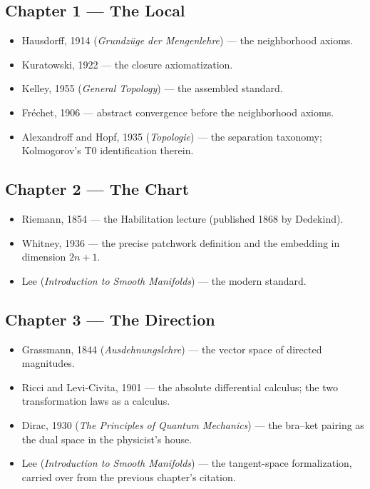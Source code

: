 \subsection*{Chapter 1 --- The Local}
\begin{itemize}
\item Hausdorff, 1914 (\emph{Grundz\"uge der Mengenlehre}) --- the
neighborhood axioms. \item Kuratowski, 1922 --- the closure
axiomatization. \item Kelley, 1955 (\emph{General Topology}) --- the
assembled standard. \item Fr\'echet, 1906 --- abstract convergence before
the neighborhood axioms. \item Alexandroff and Hopf, 1935
(\emph{Topologie}) --- the separation taxonomy; Kolmogorov's T0
identification therein.
\end{itemize}

\subsection*{Chapter 2 --- The Chart}
\begin{itemize}
\item Riemann, 1854 --- the Habilitation lecture (published 1868 by
Dedekind). \item Whitney, 1936 --- the precise patchwork definition and
the embedding in dimension $2n{+}1$. \item Lee
(\emph{Introduction to Smooth Manifolds}) --- the modern standard.
\end{itemize}

\subsection*{Chapter 3 --- The Direction}
\begin{itemize}
\item Grassmann, 1844 (\emph{Ausdehnungslehre}) --- the vector space of
directed magnitudes. \item Ricci and Levi-Civita, 1901 --- the absolute
differential calculus; the two transformation laws as a calculus.
\item Dirac, 1930 (\emph{The Principles of Quantum Mechanics}) --- the
bra--ket pairing as the dual space in the physicist's house.
\item Lee (\emph{Introduction to Smooth Manifolds}) --- the tangent-space
formalization, carried over from the previous chapter's citation.
\end{itemize}

